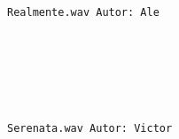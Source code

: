 \documentclass[11pt]{article}
\begin{document}
    \begin{center}
    \end{center}
    { \hspace*{\fill} \\}
    
    \begin{Verbatim}[commandchars=\\\{\}]
Realmente.wav Autor: Ale

    \end{Verbatim}

    \begin{center}
    \end{center}
    { \hspace*{\fill} \\}
    
    \begin{center}
    \end{center}
    { \hspace*{\fill} \\}
    
    \begin{center}
    \end{center}
    { \hspace*{\fill} \\}
    
    \begin{Verbatim}[commandchars=\\\{\}]
Serenata.wav Autor: Victor

    \end{Verbatim}

    \begin{center}
    \end{center}
    { \hspace*{\fill} \\}
    
    \begin{center}
    \end{center}
    { \hspace*{\fill} \\}
    
\end{document}
